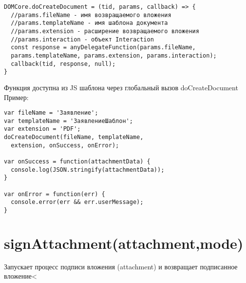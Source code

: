 \begin{verbatim}
DOMCore.doCreateDocument = (tid, params, callback) => {
  //params.fileName - имя возвращаемого вложения
  //params.templateName - имя шаблона документа
  //params.extension - расширение возвращаемого вложения
  //params.interaction - объект Interaction
  const response = anyDelegateFunction(params.fileName, 
  params.templateName, params.extension, params.interaction);
  callback(tid, response, null);
}
\end{verbatim}

Функция доступна из JS шаблона через глобальный вызов doCreateDocument
Пример:

\begin{verbatim}
var fileName = 'Заявление';
var templateName = 'ЗаявлениеШаблон';
var extension = 'PDF';
doCreateDocument(fileName, templateName, 
  extension, onSuccess, onError);

var onSuccess = function(attachmentData) {
  console.log(JSON.stringify(attachmentData));
}

var onError = function(err) {
  console.error(err && err.userMessage);
}
\end{verbatim}

\hypertarget{attachment-mode}{%
\section{signAttachment(attachment,mode)}\label{attachment-mode}}

Запускает процесс подписи вложения (attachment) и возвращает подписанное
вложение\textless{}



